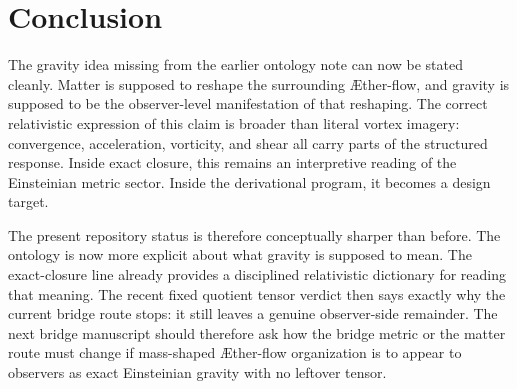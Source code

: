 \documentclass[11pt]{article}
\newcommand{\Aflow}{\AE{}ther-flow}
\begin{document}
\section{Conclusion}

The gravity idea missing from the earlier ontology note can now be stated cleanly. Matter is supposed to reshape the surrounding \Aflow{}, and gravity is supposed to be the observer-level manifestation of that reshaping. The correct relativistic expression of this claim is broader than literal vortex imagery: convergence, acceleration, vorticity, and shear all carry parts of the structured response. Inside exact closure, this remains an interpretive reading of the Einsteinian metric sector. Inside the derivational program, it becomes a design target.

The present repository status is therefore conceptually sharper than before. The ontology is now more explicit about what gravity is supposed to mean. The exact-closure line already provides a disciplined relativistic dictionary for reading that meaning. The recent fixed quotient tensor verdict then says exactly why the current bridge route stops: it still leaves a genuine observer-side remainder. The next bridge manuscript should therefore ask how the bridge metric or the matter route must change if mass-shaped \Aflow{} organization is to appear to observers as exact Einsteinian gravity with no leftover tensor.
\end{document}
